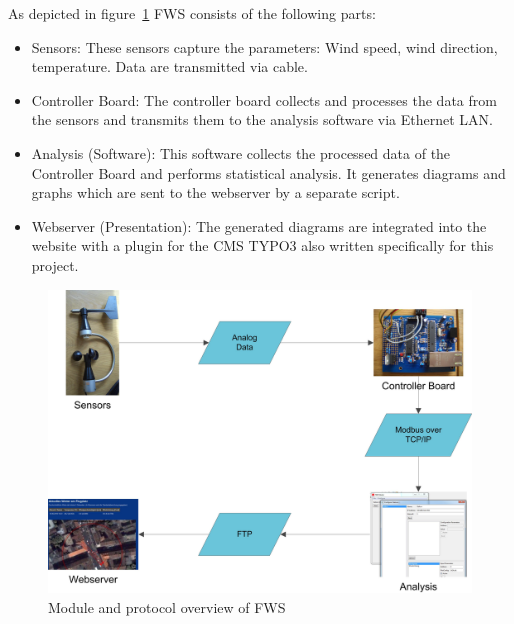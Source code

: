 As depicted in figure~\ref{fig:fws_overview} FWS consists of the following parts:
\begin{itemize}
\item Sensors: These sensors capture the parameters: Wind speed, wind direction, temperature. Data are transmitted via cable.
\item Controller Board: The controller board collects and processes the data from the sensors and transmits them to the analysis software via Ethernet LAN.
\item Analysis (Software): This software collects the processed data of the Controller Board and performs statistical analysis. It generates diagrams and graphs which are sent to the webserver by a separate script.
\item Webserver (Presentation): The generated diagrams are integrated into the website with a plugin for the CMS TYPO3 also written specifically for this project.
\end{itemize}

\begin{figure}[ht]
    \centering
    \includegraphics[width=\linewidth]{graphics/overview.jpg}
    \caption{Module and protocol overview of FWS}
    \label{fig:fws_overview}
\end{figure}

